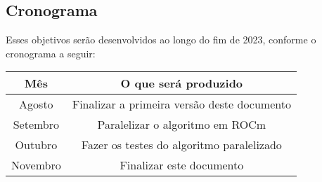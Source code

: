 \subsection{Cronograma} \label{Cronograma}

Esses objetivos serão desenvolvidos ao longo do fim de 2023, conforme o
cronograma a seguir:

\begin{center}
    \begin{tabular}{|c|c|}
        \hline
        Mês & O que será produzido \\
        \hline
        Agosto & Finalizar a primeira versão deste documento \\
        \hline
        Setembro & Paralelizar o algoritmo em ROCm \\
        \hline
        Outubro & Fazer os testes do algoritmo paralelizado \\
        \hline
        Novembro & Finalizar este documento \\
        \hline
    \end{tabular}
\end{center}
